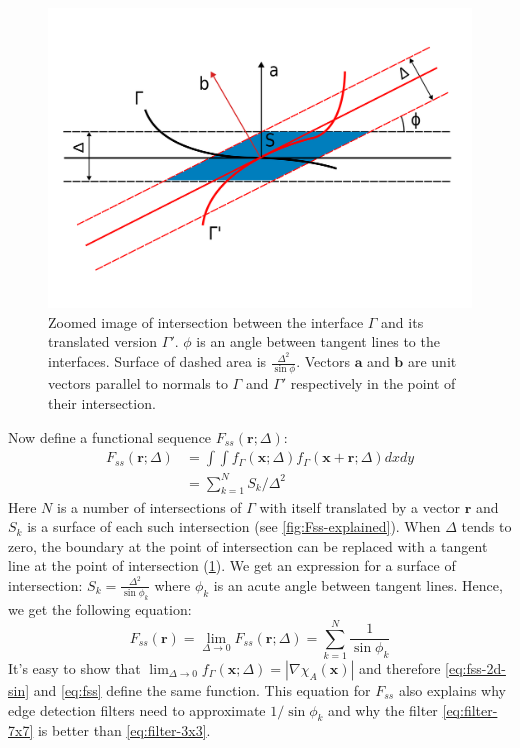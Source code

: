 \documentclass[reprint,amsmath,amssymb,aps,pre,showkeys,showpacs]{revtex4-1}
\begin{document}
\begin{figure}
  \centering
  \includegraphics[width=0.8\linewidth]{images/fss-zoomed.png}
  \caption[]{Zoomed image of intersection between the interface $\Gamma$ and its
    translated version $\Gamma'$. $\phi$ is an angle between tangent lines to
    the interfaces. Surface of dashed area is
    $\frac{\Delta^2}{\sin \phi}$. Vectors $\bm{a}$ and $\bm{b}$ are unit vectors
    parallel to normals to $\Gamma$ and $\Gamma'$ respectively in the point of
    their intersection.}
  \label{fig:fss-zoomed}
\end{figure}
Now define a functional sequence $F_{ss}(\bm{r}; \Delta)$:
\begin{align*}
  F_{ss}(\bm{r}; \Delta) &= \int\int f_\Gamma(\bm{x}; \Delta) f_\Gamma(\bm{x}
  + \bm{r}; \Delta) dx dy \\
  &= \sum_{k=1}^N S_k/\Delta^2
\end{align*}
Here $N$ is a number of intersections of $\Gamma$ with itself translated by a
vector $\bm{r}$ and $S_k$ is a surface of each such intersection (see
\cref{fig:Fss-explained}).
When $\Delta$ tends to zero, the boundary at the point of intersection can
be replaced with a tangent line at the point of intersection
(\cref{fig:fss-zoomed}). We get an expression for a surface of
intersection: $S_k = \frac{\Delta^2}{\sin \phi_k}$ where $\phi_k$ is an
acute angle between tangent lines. Hence, we get the following equation:
\begin{equation}
  F_{ss}(\bm{r}) = \lim_{\Delta \to 0} F_{ss}(\bm{r}; \Delta) =
  \sum_{k=1}^N \frac{1}{\sin \phi_k} \label{eq:fss-2d-sin}
\end{equation}
It's easy to show that
$\lim_{\Delta \to 0} f_\Gamma(\bm{x}; \Delta) = |\nabla \chi_A(\bm{x})|$
and therefore \cref{eq:fss-2d-sin} and \cref{eq:fss} define the same
function. This equation for $F_{ss}$ also explains why edge detection filters
need to approximate $1/\sin \phi_k$ and why the filter \cref{eq:filter-7x7} is
better than \cref{eq:filter-3x3}.
\end{document}
